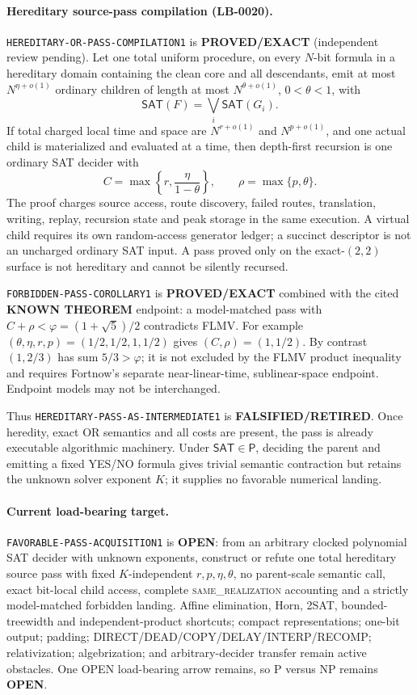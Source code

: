 \documentclass[11pt]{article}
\newcommand{\SAT}{\mathsf{SAT}}
\begin{document}
\paragraph{Hereditary source-pass compilation (LB-0020).}
\texttt{HEREDITARY-OR-PASS-COMPILATION1} is
\textbf{PROVED/EXACT} (independent review pending).  Let one total uniform
procedure, on every \(N\)-bit formula in a hereditary domain containing the
clean core and all descendants, emit at most \(N^{\eta+o(1)}\) ordinary
children of length at most \(N^{\theta+o(1)}\), \(0<\theta<1\), with
\[
 \SAT(F)=\bigvee_i\SAT(G_i).
\]
If total charged local time and space are \(N^{r+o(1)}\) and
\(N^{p+o(1)}\), and one actual child is materialized and evaluated at a time,
then depth-first recursion is one ordinary SAT decider with
\[
 \boxed{C=\max\left\{r,\frac{\eta}{1-\theta}\right\}},\qquad
 \boxed{\rho=\max\{p,\theta\}}.
\]
The proof charges source access, route discovery, failed routes, translation,
writing, replay, recursion state and peak storage in the same execution.
A virtual child requires its own random-access generator ledger; a succinct
descriptor is not an uncharged ordinary SAT input.  A pass proved only on the
exact-\((2,2)\) surface is not hereditary and cannot be silently recursed.

\texttt{FORBIDDEN-PASS-COROLLARY1} is \textbf{PROVED/EXACT} combined with
the cited \textbf{KNOWN THEOREM} endpoint: a model-matched pass with
\(C+\rho<\varphi=(1+\sqrt5)/2\) contradicts FLMV.  For example
\((\theta,\eta,r,p)=(1/2,1/2,1,1/2)\) gives \((C,\rho)=(1,1/2)\).
By contrast \((1,2/3)\) has sum \(5/3>\varphi\); it is not excluded by the
FLMV product inequality and requires Fortnow's separate near-linear-time,
sublinear-space endpoint.  Endpoint models may not be interchanged.

Thus \texttt{HEREDITARY-PASS-AS-INTERMEDIATE1} is
\textbf{FALSIFIED/RETIRED}.  Once heredity, exact OR semantics and all costs
are present, the pass is already executable algorithmic machinery.  Under
\(\SAT\in\mathsf P\), deciding the parent and emitting a fixed YES/NO formula
gives trivial semantic contraction but retains the unknown solver exponent
\(K\); it supplies no favorable numerical landing.

\paragraph{Current load-bearing target.}
\texttt{FAVORABLE-PASS-ACQUISITION1} is \textbf{OPEN}: from an arbitrary
clocked polynomial SAT decider with unknown exponents, construct or refute one
total hereditary source pass with fixed \(K\)-independent
\(r,p,\eta,\theta\), no parent-scale semantic call, exact bit-local child
access, complete \textsc{same\_realization} accounting and a strictly
model-matched forbidden landing.  Affine elimination, Horn, 2SAT,
bounded-treewidth and independent-product shortcuts; compact
representations; one-bit output; padding; DIRECT/DEAD/COPY/DELAY/INTERP/RECOMP;
relativization; algebrization; and arbitrary-decider transfer remain active
obstacles.  One OPEN load-bearing arrow remains, so P versus NP remains
\textbf{OPEN}.
\end{document}
